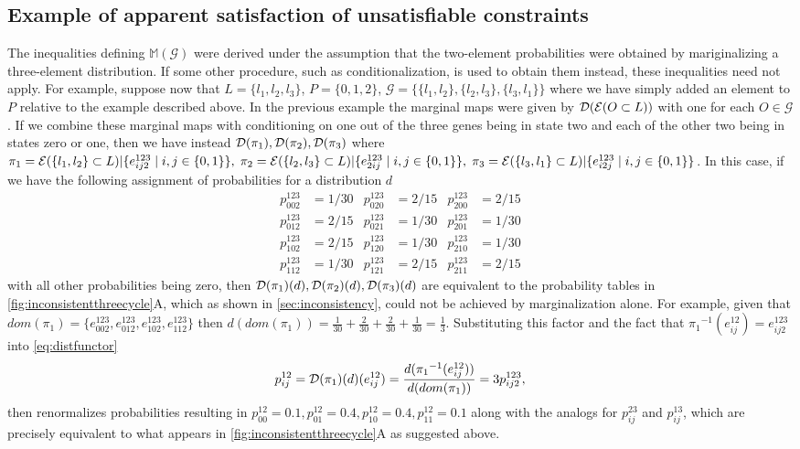 \subsection{Example of apparent satisfaction of unsatisfiable constraints}\label{secsupp:apparentinconsistency}
The inequalities defining $\mathbb{M}(\mathcal{G})$ were derived under the assumption that the two-element probabilities were obtained by mariginalizing a three-element distribution.  If some other procedure, such as conditionalization, is used to obtain them instead, these inequalities need not apply. For example, suppose now that $L = \{l_1,l_2,l_3 \}$, $P = \{0,1,2\}$, $\mathcal{G} = \{\{l_1,l_2\},\{l_2,l_3\},\{l_3,l_1\}\}$ where we have simply added an element to $P$ relative to the example described above. In the previous example the marginal maps were given by $\mathcal{D} (\mathcal{E} (O \subset L))$ with one for each $O \in \mathcal{G}$. If we combine these marginal maps with conditioning on one out of the three genes being in state two and each of the other two being in states zero or one, then we have instead $\mathcal{D} (\pi_1), \mathcal{D} (\pi_2), \mathcal{D} (\pi_3)$ where $\pi_1 = \mathcal{E} (\{l_1,l_2\} \subset L)|\{ e^{123}_{ij2} \mid i,j \in \{ 0,1 \} \},\; \pi_2 = \mathcal{E} (\{l_2,l_3\} \subset L)|\{ e^{123}_{2ij} \mid i,j \in \{ 0,1 \} \},\; \pi_3 = \mathcal{E} (\{l_3,l_1\} \subset L)|\{ e^{123}_{i2j} \mid i,j \in \{ 0,1 \} \}$. In this case, if we have the following assignment of probabilities for a distribution $d$
\begin{equation}\label{eq:condprobs}
\begin{aligned}
p^{123}_{002} &= 1/30 & p^{123}_{020} &= 2/15 & p^{123}_{200} &= 2/15\\
p^{123}_{012} &= 2/15 & p^{123}_{021} &= 1/30 & p^{123}_{201} &= 1/30\\
p^{123}_{102} &= 2/15 & p^{123}_{120} &= 1/30 & p^{123}_{210} &= 1/30\\
p^{123}_{112} &= 1/30 & p^{123}_{121} &= 2/15 & p^{123}_{211} &= 2/15
\end{aligned}
\end{equation}
with all other probabilities being zero, then $\mathcal{D} (\pi_1)(d), \mathcal{D} (\pi_2)(d), \mathcal{D} (\pi_3)(d)$ are equivalent to the probability tables in \ref{fig:inconsistentthreecycle}A, which as shown in \ref{sec:inconsistency}, could not be achieved by marginalization alone. For example, given that $dom(\pi_1) = \{ e^{123}_{002}, e^{123}_{012}, e^{123}_{102}, e^{123}_{112} \}$ then $d(dom(\pi_1)) = \frac{1}{30} + \frac{2}{30} + \frac{2}{30} + \frac{1}{30} = \frac{1}{3}$. Substituting this factor and the fact that ${\pi_1}^{-1}(e^{12}_{ij}) = e^{123}_{ij2}$ into \ref{eq:distfunctor}
$$
p^{12}_{ij} = \mathcal{D} (\pi_1)(d)(e^{12}_{ij}) = \frac{d({\pi_1}^{-1}(e^{12}_{ij}))}{d(dom(\pi_1))} = 3 p^{123}_{ij2},
$$
then renormalizes probabilities resulting in $p^{12}_{00} = 0.1, p^{12}_{01} = 0.4, p^{12}_{10} = 0.4, p^{12}_{11} = 0.1$ along with the analogs for $p^{23}_{ij}$ and $p^{13}_{ij}$, which are precisely equivalent to what appears in \ref{fig:inconsistentthreecycle}A as suggested above.

